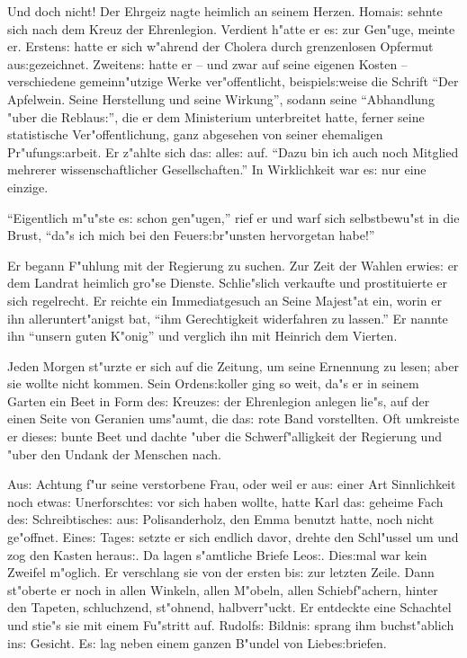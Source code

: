 \documentclass[oneside,12pt]{book}
\newcommand{\s}{s:}%
\begin{document}
Und doch nicht! Der Ehrgeiz nagte heimlich an seinem Herzen.
Homai{\s} sehnte sich nach dem Kreuz der Ehrenlegion. Verdient
h"atte er e{\s} zur Gen"uge, meinte er. Ersten{\s} hatte er sich
w"ahrend der Cholera durch grenzenlosen Opfermut au{\s}gezeichnet.
Zweiten{\s} hatte er -- und zwar auf seine eigenen Kosten --
verschiedene gemeinn"utzige Werke ver"offentlicht,
beispiel{\s}weise die Schrift "`Der Apfelwein. Seine Herstellung
und seine Wirkung"', sodann seine "`Abhandlung "uber die
Reblau{\s}"', die er dem Ministerium unterbreitet hatte, ferner
seine statistische Ver"offentlichung, ganz abgesehen von seiner
ehemaligen Pr"ufung{\s}arbeit. Er z"ahlte sich da{\s} alle{\s}
auf. "`Dazu bin ich auch noch Mitglied mehrerer wissenschaftlicher
Gesellschaften."' In Wirklichkeit war e{\s} nur eine einzige.

"`Eigentlich m"u"ste e{\s} schon gen"ugen,"' rief er und warf sich
selbstbewu"st in die Brust, "`da"s ich mich bei den
Feuer{\s}br"unsten hervorgetan habe!"'

Er begann F"uhlung mit der Regierung zu suchen. Zur Zeit der
Wahlen erwie{\s} er dem Landrat heimlich gro"se Dienste.
Schlie"slich verkaufte und prostituierte er sich regelrecht. Er
reichte ein Immediatgesuch an Seine Majest"at ein, worin er ihn
alleruntert"anigst bat, "`ihm Gerechtigkeit widerfahren zu
lassen."' Er nannte ihn "`unsern guten K"onig"' und verglich ihn
mit Heinrich dem Vierten.

Jeden Morgen st"urzte er sich auf die Zeitung, um seine Ernennung
zu lesen; aber sie wollte nicht kommen. Sein Orden{\s}koller ging
so weit, da"s er in seinem Garten ein Beet in Form de{\s}
Kreuze{\s} der Ehrenlegion anlegen lie"s, auf der einen Seite von
Geranien ums"aumt, die da{\s} rote Band vorstellten. Oft umkreiste
er diese{\s} bunte Beet und dachte "uber die Schwerf"alligkeit der
Regierung und "uber den Undank der Menschen nach.

Au{\s} Achtung f"ur seine verstorbene Frau, oder weil er au{\s}
einer Art Sinnlichkeit noch etwa{\s} Unerforschte{\s} vor sich
haben wollte, hatte Karl da{\s} geheime Fach de{\s}
Schreibtische{\s} au{\s} Polisanderholz, den Emma benutzt hatte,
noch nicht ge"offnet. Eine{\s} Tage{\s} setzte er sich endlich
davor, drehte den Schl"ussel um und zog den Kasten herau{\s}. Da
lagen s"amtliche Briefe Leo{\s}. Die{\s}mal war kein Zweifel
m"oglich. Er verschlang sie von der ersten bi{\s} zur letzten
Zeile. Dann st"oberte er noch in allen Winkeln, allen M"obeln,
allen Schiebf"achern, hinter den Tapeten, schluchzend, st"ohnend,
halbverr"uckt. Er entdeckte eine Schachtel und stie"s sie mit
einem Fu"stritt auf. Rudolf{\s} Bildni{\s} sprang ihm
buchst"ablich in{\s} Gesicht. E{\s} lag neben einem ganzen B"undel
von Liebe{\s}briefen.
\end{document}
